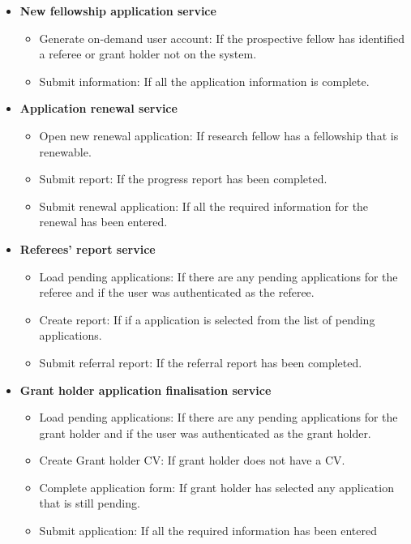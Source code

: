 \documentclass[12pt]{article}
\begin{document}
\begin{itemize}
	\item \textbf{New fellowship application service}
		\begin{itemize}
			\item Generate on-demand user account: If the prospective fellow has identified a referee or grant holder not on the system.
			\item Submit information: If all the application information is complete.
		\end{itemize}
	
	\item \textbf{Application renewal service}
		\begin{itemize}
			\item Open new renewal application: If research fellow has a fellowship that is renewable.
			\item Submit report: If the progress report has been completed.				
			\item Submit renewal application: If all the required information for the renewal has been entered.									
		\end{itemize}
	
	\item \textbf{Referees' report service}
		\begin{itemize}
			\item Load pending applications: If there are any pending applications for the referee and if the user was authenticated as the referee.
			\item Create report: If if a application is selected from the list of pending applications.				
			\item Submit referral report: If the referral report has been completed.									
		\end{itemize}
		
	\item \textbf{Grant holder application finalisation service}
		\begin{itemize}
			\item Load pending applications: If there are any pending applications for the grant holder and if the user was authenticated as the grant holder.
			\item Create Grant holder CV: If grant holder does not have a CV.
			\item Complete application form: If grant holder has selected any application that is still pending.
			\item Submit application: If all the required information has been entered									
		\end{itemize}
			

\end{itemize}
\end{document}
